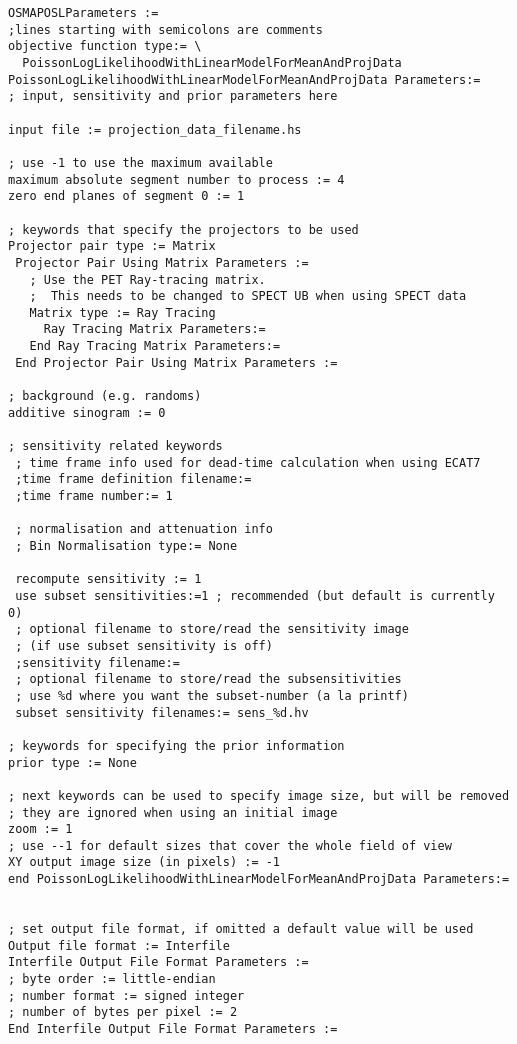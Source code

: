 \documentclass{article}
\begin{document}
{\small 
\begin{verbatim}
OSMAPOSLParameters :=
;lines starting with semicolons are comments
objective function type:= \
  PoissonLogLikelihoodWithLinearModelForMeanAndProjData
PoissonLogLikelihoodWithLinearModelForMeanAndProjData Parameters:=
; input, sensitivity and prior parameters here

input file := projection_data_filename.hs

; use -1 to use the maximum available
maximum absolute segment number to process := 4
zero end planes of segment 0 := 1

; keywords that specify the projectors to be used
Projector pair type := Matrix 
 Projector Pair Using Matrix Parameters := 
   ; Use the PET Ray-tracing matrix.
   ;  This needs to be changed to SPECT UB when using SPECT data
   Matrix type := Ray Tracing
     Ray Tracing Matrix Parameters:=
   End Ray Tracing Matrix Parameters:= 
 End Projector Pair Using Matrix Parameters :=

; background (e.g. randoms)
additive sinogram := 0

; sensitivity related keywords
 ; time frame info used for dead-time calculation when using ECAT7
 ;time frame definition filename:=
 ;time frame number:= 1

 ; normalisation and attenuation info
 ; Bin Normalisation type:= None
 
 recompute sensitivity := 1
 use subset sensitivities:=1 ; recommended (but default is currently 0)
 ; optional filename to store/read the sensitivity image 
 ; (if use subset sensitivity is off)
 ;sensitivity filename:=
 ; optional filename to store/read the subsensitivities
 ; use %d where you want the subset-number (a la printf)
 subset sensitivity filenames:= sens_%d.hv

; keywords for specifying the prior information
prior type := None

; next keywords can be used to specify image size, but will be removed
; they are ignored when using an initial image
zoom := 1
; use --1 for default sizes that cover the whole field of view
XY output image size (in pixels) := -1
end PoissonLogLikelihoodWithLinearModelForMeanAndProjData Parameters:=


; set output file format, if omitted a default value will be used
Output file format := Interfile 
Interfile Output File Format Parameters := 
; byte order := little-endian 
; number format := signed integer 
; number of bytes per pixel := 2 
End Interfile Output File Format Parameters :=


\end{verbatim}}
\end{document}
